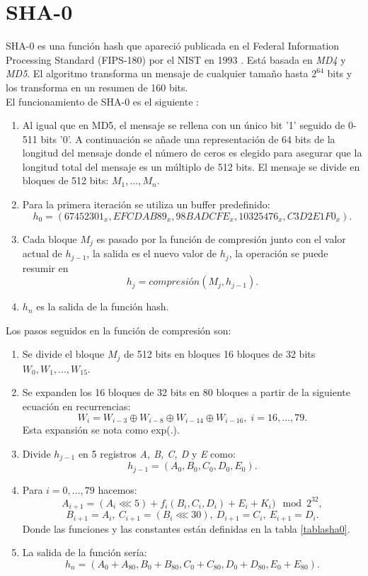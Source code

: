 \section{SHA-0}
SHA-0 es una función hash que apareció publicada en el Federal Information Processing Standard (FIPS-180) por el NIST en 1993 \cite{Penard2008}. Está basada en \emph{MD4} y \emph{MD5}. El algoritmo transforma un mensaje de cualquier tamaño hasta $2^{64}$ bits y los transforma en un resumen de 160 bits.\\
El funcionamiento de SHA-0 es el siguiente \cite{sha0}:
\begin{enumerate}
	\item Al igual que en MD5, el mensaje se rellena con un único bit '1' seguido de 0-511 bits '0'. A continuación se añade una representación de 64 bits de la longitud del mensaje donde el número de ceros es elegido para asegurar que la longitud total del mensaje es un múltiplo de 512 bits. El mensaje se divide en bloques de 512 bits: $M_1,...,M_n$.
	\item Para la primera iteración se utiliza un buffer predefinido:
	$$
		h_0=(67452301_x, EFCDAB89_x, 98BADCFE_x, 10325476_x, C3D2E1F0_x).
	$$
	\item Cada bloque $M_j$ es pasado por la función de compresión junto con el valor actual de $h_{j-1}$, la salida es el nuevo valor de $h_j$, la operación se puede resumir en
	$$
		h_j=compresión(M_j,h_{j-1}).
	$$
	\item $h_n$ es la salida de la función hash.
\end{enumerate}
Los pasos seguidos en la función de compresión son:
\begin{enumerate}
	\item Se divide el bloque $M_j$ de 512 bits en bloques 16 bloques de 32 bits $W_0,W_1,...,W_{15}$. 
	\item Se expanden los 16 bloques de 32 bits en 80 bloques a partir de la siguiente ecuación en recurrencias:
	$$
		W_i=W_{i-3}\oplus W_{i-8}\oplus W_{i-14}\oplus W_{i-16},\; i=16,...,79.
	$$
	Esta expansión se nota como exp(.).
	\item Divide $h_{j-1}$ en 5 registros \emph{A, B, C, D} y \emph{E} como:
	$$
		h_{j-1} = (A_0, B_0, C_0, D_0, E_0).
	$$
	\item Para $i=0,...,79$ hacemos:
	$$
		A_{i+1}=(A_i\lll5)+f_i(B_i,C_i,D_i)+E_i+K_i) \mod 2^{32},
	$$
	$$
		B_{i+1}=A_i,\: C_{i+1}=(B_i\lll30),\: D_{i+1}=C_i,\: E_{i+1}=D_i.
	$$
	Donde las funciones y las constantes están definidas en la tabla \ref{tablasha0}.
	\item La salida de la función sería:
	$$
		h_n=(A_0+A_{80}, B_0+B_{80}, C_0+C_{80}, D_0+D_{80}, E_0+E_{80}).
	$$
\end{enumerate}

